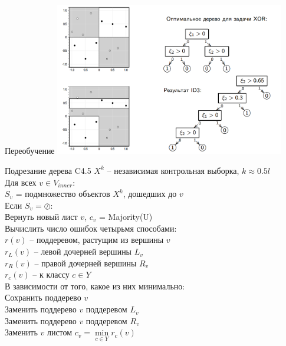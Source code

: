 \documentclass[10pt]{beamer}
\begin{document}
\begin{frame}{Переобучение}
  \includegraphics[height=190pt, keepaspectratio = true]{images/overfitting}   
\end{frame}

{
\begin{frame}{Подрезание дерева C4.5}
  $X^k$ -- независимая контрольная выборка, $k \approx 0.5l$\\
	Для всех $v \in V_{inner}$:\\
		\hspace{10mm} $S_v$ = подмножество объектов $X^k$, дошедших до $v$\\
		\hspace{10mm} Если $S_v = \oslash$:\\
		  \hspace{20mm} Вернуть новый лист $v$, $c_v$ = Majority(U)\\
		\hspace{10mm} Вычислить число ошибок четырьмя способами:\\
			\hspace{20mm} $r(v)$ -- поддеревом, растущим из вершины $v$\\
			\hspace{20mm} $r_L(v)$ -- левой дочерней вершины $L_v$\\
			\hspace{20mm} $r_R(v)$ -- правой дочерней вершины $R_v$\\
			\hspace{20mm} $r_c(v)$ -- к классу $c \in Y$\\
		\hspace{10mm} В зависимости от того, какое из них минимально:\\
			\hspace{20mm} Сохранить поддерево $v$\\
			\hspace{20mm} Заменить поддерево $v$ поддеревом $L_v$\\
			\hspace{20mm} Заменить поддерево $v$ поддеревом $R_v$\\
			\hspace{20mm} Заменить $v$ листом $c_v = \min\limits_{c \in Y} r_c(v)$\\
\end{frame}
}
\end{document}
